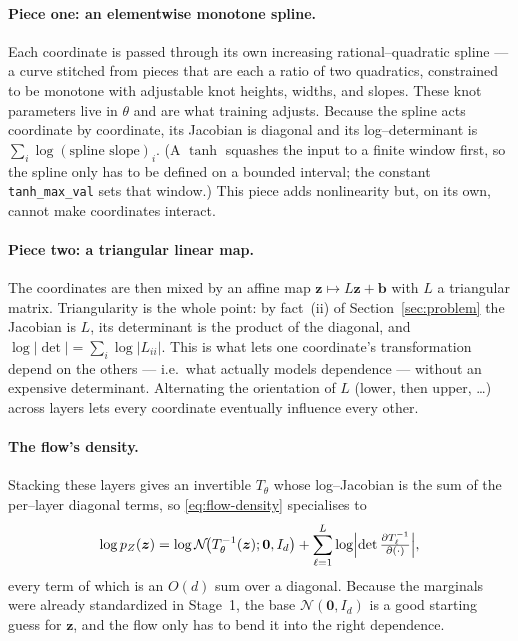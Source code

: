 \documentclass[11pt]{article}
\newcommand{\Ncal}{\mathcal{N}}
\newcommand{\z}{\bm{z}}
\theoremstyle{remark}
\begin{document}
\paragraph{Piece one: an elementwise monotone spline.}
Each coordinate is passed through its own increasing rational--quadratic spline
--- a curve stitched from pieces that are each a ratio of two quadratics,
constrained to be monotone with adjustable knot heights, widths, and slopes.
These knot parameters live in $\theta$ and are what training adjusts. Because the
spline acts coordinate by coordinate, its Jacobian is diagonal and its
log--determinant is $\sum_i\log(\text{spline slope})_i$. (A $\tanh$ squashes the
input to a finite window first, so the spline only has to be defined on a bounded
interval; the constant \texttt{tanh\_max\_val} sets that window.) This piece adds
nonlinearity but, on its own, cannot make coordinates interact.

\paragraph{Piece two: a triangular linear map.}
The coordinates are then mixed by an affine map $\z\mapsto L\z+\bm b$ with $L$ a
triangular matrix. Triangularity is the whole point: by fact~(ii) of
Section~\ref{sec:problem} the Jacobian is $L$, its determinant is the product of
the diagonal, and $\log|\det|=\sum_i\log|L_{ii}|$. This is what lets one
coordinate's transformation depend on the others --- i.e.\ what actually models
dependence --- without an expensive determinant. Alternating the orientation of
$L$ (lower, then upper, \dots) across layers lets every coordinate eventually
influence every other.

\paragraph{The flow's density.}
Stacking these layers gives an invertible $T_\theta$ whose log--Jacobian is the
sum of the per--layer diagonal terms, so \eqref{eq:flow-density} specialises to
\begin{equation}
\label{eq:pz}
\log p_Z(\z)=\log\Ncal\!\bigl(T_\theta^{-1}(\z);\bm0,I_d\bigr)
+\sum_{\ell=1}^{L}\log\Bigl|\det \tfrac{\partial T_\ell^{-1}}{\partial(\cdot)}\Bigr|,
\end{equation}
every term of which is an $O(d)$ sum over a diagonal. Because the marginals were
already standardized in Stage~1, the base $\Ncal(\bm0,I_d)$ is a good starting
guess for $\z$, and the flow only has to bend it into the right dependence.
\end{document}
